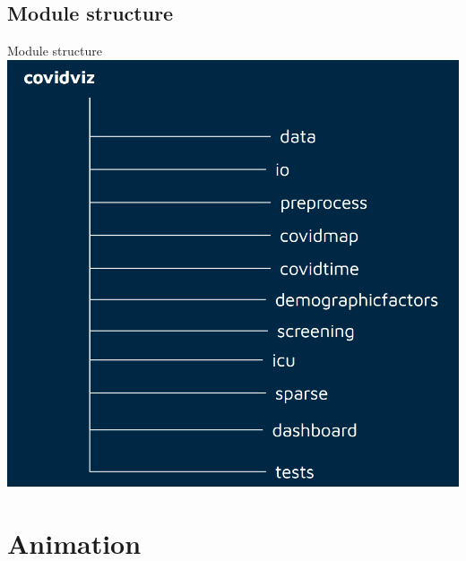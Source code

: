 \documentclass[11pt, compress, tikz, xcolor=table]{beamer}
\theoremstyle{definition}
\begin{document}
\subsection{Module structure}
\begin{frame}[fragile]{Module structure}
        \centering
        \includegraphics[scale=0.3]{images/structure.png}%

\end{frame}

\section{Animation}
\end{document}
